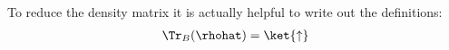To reduce the density matrix it is actually helpful to write out the definitions:
\begin{align}
\Tr_B(\rhohat) = \ket{\uparrow}
\end{align}